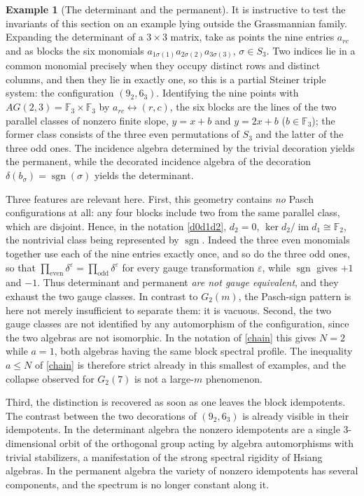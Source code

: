 \documentclass[times,11pt,reqno]{amsproc}
\theoremstyle{definition}
\newtheorem{example}[theorem]{Example}
\numberwithin{equation}{section}
\begin{document}
\begin{example}[The determinant and the permanent]\label{rem:detper}
It is instructive to test the invariants of this section on an example
lying outside the Grassmannian family. Expanding the determinant of a
$3\times3$ matrix, take as points the nine entries $a_{rc}$ and as blocks
the six monomials
$a_{1\sigma(1)}a_{2\sigma(2)}a_{3\sigma(3)}$, $\sigma\in S_3$.
Two indices lie in a common monomial precisely when they occupy distinct rows and distinct columns, and then they lie in exactly one, so this is a
partial Steiner triple system: the configuration $(9_2,6_3)$. Identifying the nine points with $AG(2,3)=\mathbb F_3\times\mathbb F_3$ by
$a_{rc}\leftrightarrow(r,c)$, the six blocks are the lines of the two
parallel classes of nonzero finite slope, $y=x+b$ and $y=2x+b$
($b\in\mathbb F_3$); the former class consists of the three even
permutations of $S_3$ and the latter of the three odd ones.
The incidence algebra determined by the trivial decoration yields the
permanent, while the decorated incidence algebra of the decoration
$\delta(b_\sigma)=\operatorname{sgn}(\sigma)$ yields the determinant.

Three features are relevant here. First, this geometry contains
\emph{no} Pasch configurations at all: any four blocks include two from
the same parallel class, which are disjoint. Hence, in the notation \eqref{d0d1d2}, $d_2=0$,  $\ker d_2/\operatorname{im}d_1\cong\mathbb F_2$, the nontrivial class being represented by $\operatorname{sgn}$. Indeed the
three even monomials together use each of the nine entries exactly once,
and so do the three odd ones, so that
$\prod_{\text{even}}\delta^\varepsilon=\prod_{\text{odd}}\delta^\varepsilon$
for every gauge transformation $\varepsilon$, while $\operatorname{sgn}$
gives $+1$ and $-1$. Thus determinant and permanent \textit{are not gauge
equivalent}, and they exhaust the two gauge classes. In contrast to
$G_2(m)$, the Pasch-sign pattern is here not merely insufficient to
separate them: it is vacuous.
Second, the two gauge classes are not identified by any automorphism of the
configuration, since the two algebras are not isomorphic. In the notation
of \eqref{chain} this gives $N=2$ while $a=1$, both algebras having the
same block spectral profile. The inequality $a\le N$ of \eqref{chain} is
therefore strict already in this smallest of examples, and the collapse
observed for $G_2(7)$ is not a large-$m$ phenomenon.

Third, the distinction is recovered as soon as one leaves the block
idempotents.
The contrast between the two decorations of $(9_2,6_3)$ is already visible
in their idempotents.
In the determinant algebra the nonzero idempotents are a single $3$-dimensional orbit of the orthogonal group acting by algebra automorphisms with trivial stabilizers, a manifestation of the strong spectral rigidity of Hsiang algebras.
In the permanent algebra the variety of nonzero idempotents has several components, and the spectrum is no longer constant along it.


\end{example}
\end{document}

